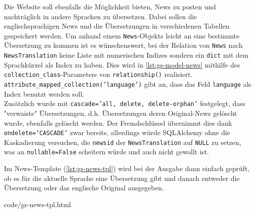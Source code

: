 Die Website soll ebenfalls die Möglichkeit bieten, News zu posten und
nachträglich in andere Sprachen zu übersetzen. Dabei sollen die
englischsprachigen News und die Übersetzungen in verschiedenen Tabellen
gespeichert werden. Um anhand einem \texttt{News}-Objekts leicht an eine
bestimmte Übersetzung zu kommen ist es wünschenswert, bei der Relation von
\texttt{News} nach \texttt{NewsTranslation} keine Liste mit numerischen Indizes
sondern ein \texttt{dict} mit dem Sprachkürzel als Index zu haben. Dies wird in
\autoref{lst:gs-model-news} mithilfe des \texttt{collection\_class}-Parameters
von \texttt{relationship()} realisiert. \\
\texttt{attribute\_mapped\_collection('language')} gibt an, dass das Feld
\texttt{language} als Index benutzt werden soll. \\
Zusätzlich wurde mit
\texttt{cascade='all, delete, delete-orphan'} festgelegt, dass "verwaiste"
Übersetzungen, d.h. Übersetzungen deren Original-News gelöscht wurde, ebenfalls
gelöscht werden. Der Fremdschlüssel übernimmt dies dank
\texttt{ondelete='CASCADE'} zwar bereits, allerdings würde SQLAlchemy ohne
die Kaskadierung versuchen, die \texttt{newsid} der \texttt{NewsTranslation} auf
\texttt{NULL} zu setzen, was an \texttt{nullable=False} scheitern würde und auch
nicht gewollt ist.



Im News-Template (\autoref{lst:gs-news-tpl}) wird bei der Ausgabe dann einfach
geprüft, ob es für die aktuelle Sprache eine Übersetzung gibt und danach
entweder die Übersetzung oder das englische Original ausgegeben.


{code/gs-news-tpl.html}
